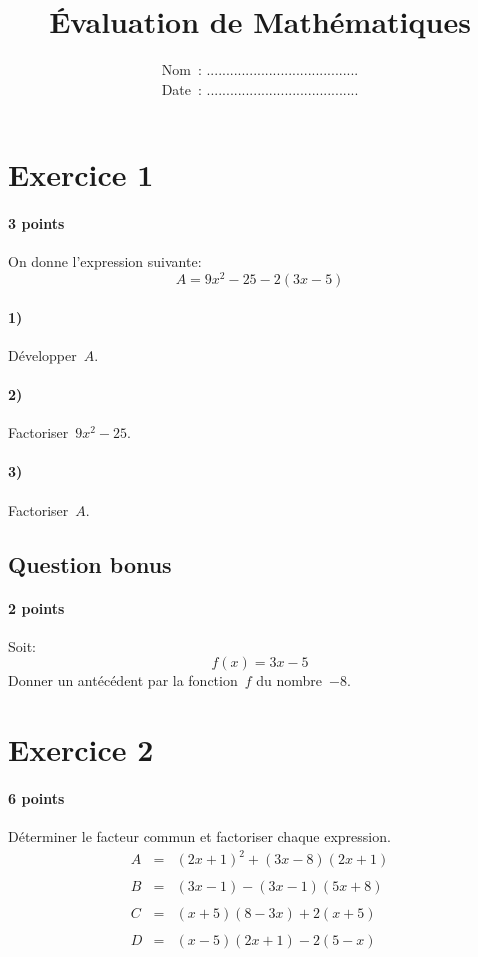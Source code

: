 \documentclass[a4paper]{article}
\begin{document}
  \title{Évaluation de Mathématiques}
  \date{
    Nom~: .......................................\\
    \vspace{0.2cm}
    Date~: .......................................}
  \maketitle

  \section*{Exercice 1}
  \paragraph{3 points}
  On donne l'expression suivante:
  \[
    A = 9 x^2 - 25 - 2(3x - 5)
  \]
  \paragraph{1)} Développer~$A$.
  \paragraph{2)} Factoriser~$9 x^2 - 25$.
  \paragraph{3)} Factoriser~$A$.

  \subsection*{Question bonus}
  \paragraph{2 points}
  Soit:
  \[
    f(x) = 3x - 5
  \]
  Donner un antécédent par la fonction~$f$ du nombre~$-8$.

  \section*{Exercice 2}
  \paragraph{6 points}
  Déterminer le facteur commun et factoriser chaque expression.
  \[
    \begin{array}{rcl}
      A &=& (2x + 1)^2 + (3x - 8) (2x + 1)\\\\
      B &=& (3x - 1) - (3x - 1)(5x + 8)\\\\
      C &=& (x + 5)(8 - 3x) + 2(x + 5)\\\\
      D &=& (x - 5)(2x + 1) - 2(5 - x)
    \end{array}
  \]
\end{document}
